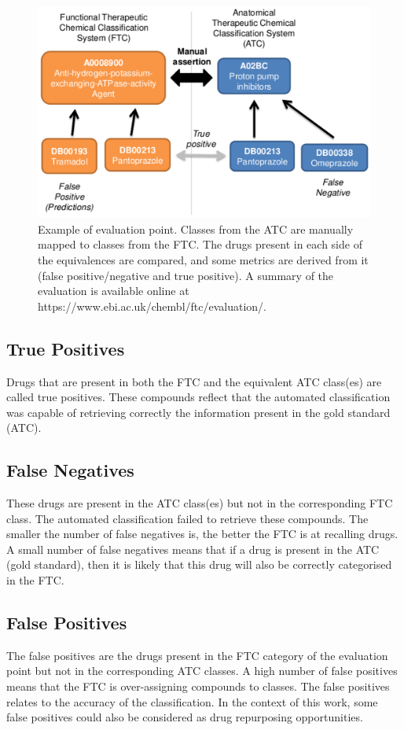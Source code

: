 \documentclass{bioinfo}
\begin{document}
\begin{figure}[!tpb]%
\centerline{\includegraphics{figS2.png}}
\caption{Example of evaluation point. Classes from the ATC are manually 
mapped to classes from the FTC. The drugs present in each side of the equivalences 
are compared, and some metrics are derived from it (false positive/negative and true positive). 
A summary of the evaluation is available online at {{https://www.ebi.ac.uk/chembl/ftc/evaluation/}}.}\label{fig:S02}
\end{figure}

\subsection{True Positives}
Drugs that are present in both the FTC and the equivalent ATC class(es) are called true positives. 
These compounds reflect that the automated classification was capable of retrieving correctly the 
information present in the gold standard (ATC).

\subsection{False Negatives}
These drugs are present in the ATC class(es) but not in the corresponding FTC class. 
The automated classification failed to retrieve these compounds. The smaller the number of 
false negatives is, the better the FTC is at recalling drugs. A small number of false negatives 
means that if a drug is present in the ATC (gold standard), then it is likely that this drug will 
also be correctly categorised in the FTC.

\subsection{False Positives}
The false positives are the drugs present in the FTC category of the evaluation point but not in the corresponding ATC classes. 
A high number of false positives means that the FTC is over-assigning compounds to classes.
The false positives relates to the accuracy of the classification. In the context of this work, 
some false positives could also be considered as drug repurposing opportunities.
\end{document}
